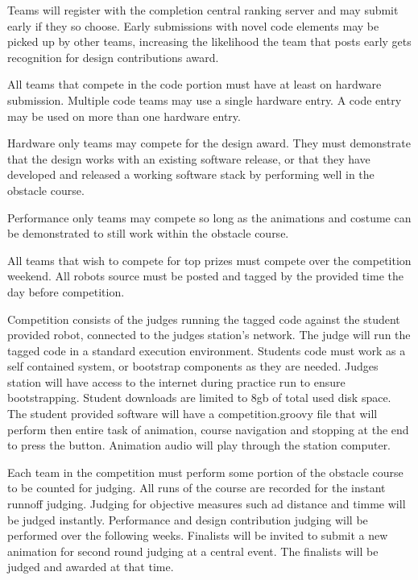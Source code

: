 \documentclass{article}
\begin{document}
\begin{enumerate}
Teams will register with the completion central ranking server and may submit early if they so choose. Early submissions with novel code elements may be picked up by other teams, increasing the likelihood the team that posts early gets recognition for design contributions award.

All teams that compete in the code portion must have at least on hardware submission. Multiple code teams may use a single hardware entry. A code entry may be used on more than one hardware entry. 

Hardware only teams may compete for the design award. They must demonstrate that the design works with an existing software release, or that they have developed and released a working software stack by performing well in the obstacle course. 

Performance only teams may compete so long as the animations and costume can be demonstrated to still work within the obstacle course. 

All teams that wish to compete for top prizes must compete over the competition weekend. All robots source must be posted and tagged by the provided time the day before competition. 

Competition consists of the judges running the tagged code against the student provided robot, connected to the judges station's network. The judge will run the tagged code in a standard execution environment. Students code must work as a self contained system, or bootstrap components as they are needed. Judges station will have access to the internet during practice run to ensure bootstrapping. Student downloads are limited to 8gb of total used disk space. The student provided software will have a competition.groovy file that will perform then entire task of animation, course navigation and stopping at the end to press the button. Animation audio will play through the station computer. 

Each team in the competition must perform some portion of the obstacle course to be counted for judging. All runs of the course are recorded for the instant runnoff judging. Judging for objective measures such ad distance and timme will be judged instantly. Performance and design contribution judging will be performed over the following weeks. Finalists will be invited to submit a new animation for second round judging at a central event. The finalists will be judged and awarded at that time. 



 

\end{enumerate}
\vspace{1cm}
 
 
\end{document}
